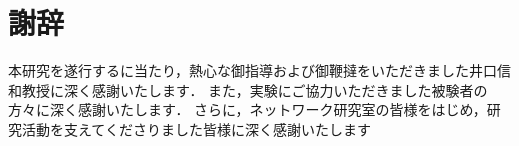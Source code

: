 \section*{謝辞}
本研究を遂行するに当たり，熱心な御指導および御鞭撻をいただきました井口信和教授に深く感謝いたします．
また，実験にご協力いただきました被験者の方々に深く感謝いたします．
さらに，ネットワーク研究室の皆様をはじめ，研究活動を支えてくださりました皆様に深く感謝いたします